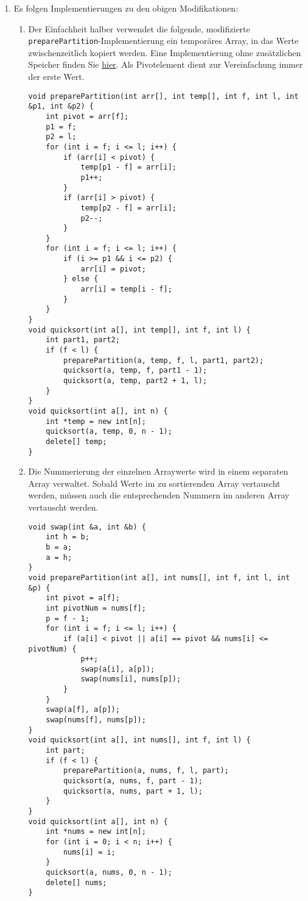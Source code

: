 \documentclass[11pt,a4paper]{article}
\begin{document}
\begin{loesung}
\begin{enumerate}
        \item Es folgen Implementierungen zu den obigen Modifikationen:
        \begin{enumerate}[label=\roman*)]
            \item Der Einfachheit halber verwendet die folgende, modifizierte \texttt{preparePartition}-Implementierung ein temporäres Array, in das Werte zwischenzeitlich kopiert werden.
            Eine Implementierung ohne zusätzlichen Speicher finden Sie \href{https://en.wikipedia.org/wiki/Dutch_national_flag_problem}{hier}. Als Pivotelement dient zur Vereinfachung immer der erste Wert.
            \begin{lstlisting}
void preparePartition(int arr[], int temp[], int f, int l, int &p1, int &p2) {
    int pivot = arr[f];
    p1 = f;
    p2 = l;
    for (int i = f; i <= l; i++) {
        if (arr[i] < pivot) {
            temp[p1 - f] = arr[i];
            p1++;
        }
        if (arr[i] > pivot) {
            temp[p2 - f] = arr[i];
            p2--;
        }
    }
    for (int i = f; i <= l; i++) {
        if (i >= p1 && i <= p2) {
            arr[i] = pivot;
        } else {
            arr[i] = temp[i - f];
        }
    }
} 
void quicksort(int a[], int temp[], int f, int l) {
    int part1, part2;
    if (f < l) {
        preparePartition(a, temp, f, l, part1, part2);
        quicksort(a, temp, f, part1 - 1);
        quicksort(a, temp, part2 + 1, l);
    }
}
void quicksort(int a[], int n) {
    int *temp = new int[n];
    quicksort(a, temp, 0, n - 1);
    delete[] temp;
}
            \end{lstlisting}

            \item 
            Die Nummerierung der einzelnen Arraywerte wird in einem separaten Array verwaltet.
            Sobald Werte im zu sortierenden Array vertauscht werden, müssen auch die entsprechenden Nummern im anderen Array vertauscht werden.
            \begin{lstlisting}
void swap(int &a, int &b) {
    int h = b;
    b = a;
    a = h;
}
void preparePartition(int a[], int nums[], int f, int l, int &p) {
    int pivot = a[f];
    int pivotNum = nums[f];
    p = f - 1;
    for (int i = f; i <= l; i++) {
        if (a[i] < pivot || a[i] == pivot && nums[i] <= pivotNum) {
            p++;
            swap(a[i], a[p]);
            swap(nums[i], nums[p]);
        }
    }
    swap(a[f], a[p]);
    swap(nums[f], nums[p]);
}
void quicksort(int a[], int nums[], int f, int l) {
    int part;
    if (f < l) {
        preparePartition(a, nums, f, l, part);
        quicksort(a, nums, f, part - 1);
        quicksort(a, nums, part + 1, l);
    }
}
void quicksort(int a[], int n) {
    int *nums = new int[n];
    for (int i = 0; i < n; i++) {
        nums[i] = i;
    }
    quicksort(a, nums, 0, n - 1);
    delete[] nums;
}
            \end{lstlisting}
        \end{enumerate}
    \end{enumerate}
\end{loesung}
\end{document}

